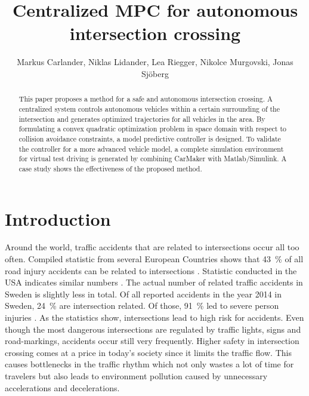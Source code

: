 \documentclass[letterpaper,10pt,conference]{ieeeconf}
\author{Markus Carlander, Niklas Lidander, Lea Riegger, Nikolce Murgovski, Jonas Sj\"oberg}
\begin{document}
\title{Centralized MPC for autonomous intersection crossing}

\maketitle
\thispagestyle{empty}
\pagestyle{empty}

\begin{abstract}
This paper proposes a method for a safe and autonomous intersection crossing. A centralized system controls autonomous vehicles within a certain surrounding of the intersection and generates optimized trajectories for all vehicles in the area. By formulating a convex quadratic optimization problem in space domain with respect to collision avoidance constraints, a model predictive controller is designed. To validate the controller for a more advanced vehicle model, a complete simulation environment for virtual test driving is generated by combining CarMaker with Matlab/Simulink. A case study shows the effectiveness of the proposed method.
\end{abstract}

\IEEEpeerreviewmaketitle

\section{Introduction}%

Around the world, traffic accidents that are related to intersections occur all too often. Compiled statistic from several European Countries shows that \SI{43}{\%} of all road injury accidents can be related to intersections \cite{molinero}. Statistic conducted in the USA indicates similar numbers \cite{nhtsa}. The actual number of related traffic accidents in Sweden is slightly less in total. Of all reported accidents in the year 2014 in Sweden, \SI{24}{\%} are intersection related. Of those, \SI{91}{\%} led to severe person injuries \cite{sverige}. As the statistics show, intersections lead to high risk for accidents. Even though the most dangerous intersections are regulated by traffic lights, signs and road-markings, accidents occur still very frequently. Higher safety in intersection crossing comes at a price in today's society since it limits the traffic flow. This causes bottlenecks in the traffic rhythm which not only wastes a lot of time for travelers but also leads to environment pollution caused by unnecessary accelerations and decelerations.
\end{document}
